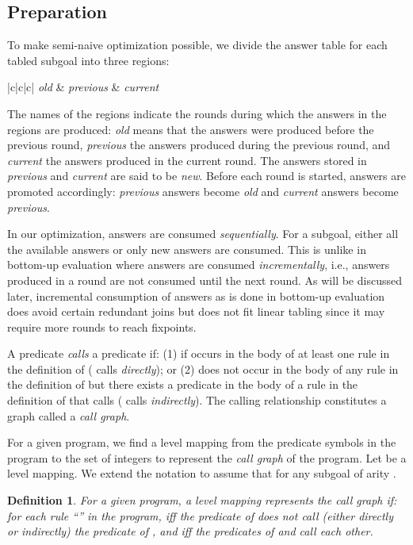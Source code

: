 \documentclass{tlp}
\newtheorem{definition}{Definition} \newtheorem{example}{Example} \newcommand{\pivot}[1]{\mathbin{\, {#1} \,}}
\begin{document}
\subsection{Preparation}
To make semi-naive optimization possible, we divide the answer table for each tabled subgoal into three regions: 
\begin{center}
\begin{oldtabular}{|c|c|c|} \oldhline
{\it old} & {\it previous} & {\it current} \\ \oldhline
\end{oldtabular}
\end{center}

\noindent
The names of the regions indicate the rounds during which the answers in the regions are produced: {\it old} means that the answers were produced before the previous round, {\it previous} the answers produced during the previous round, and {\it current} the answers produced in the current round. The answers stored in {\it previous} and {\it current} are said to be {\it new}. Before each round is started, answers are promoted accordingly: {\it previous} answers become {\it old} and {\it current} answers become {\it previous}. 

In our optimization, answers are consumed {\it sequentially}. For a subgoal, either all the available answers or only new answers are consumed. This is unlike in bottom-up evaluation where answers are consumed {\it incrementally}, i.e., answers produced in a round are not consumed until the next round. As will be discussed later, incremental consumption of answers as is done in bottom-up evaluation does avoid certain redundant joins but does not fit linear tabling since it may require more rounds to reach fixpoints.

A predicate  {\it calls} a predicate  if: (1) if  occurs in the body of at least one rule in the definition of  ( calls  {\it directly}); or (2)  does not occur in the body of any rule in the definition of  but there exists a predicate in the body of a rule in the definition of  that calls  ( calls  {\it indirectly}). The calling relationship constitutes a graph called a {\it call graph}.

For a given program, we find a level mapping from the predicate symbols in the program to the set of integers to represent the {\it call graph} of the program. Let  be a level mapping. We extend the notation to assume that  for any subgoal  of arity .

\begin{definition} {\rm For a given program, a level mapping  represents the {\it call graph} if: for each rule ``'' in the program,   iff the predicate of  does not call (either directly or indirectly) the predicate of , and  iff the predicates of  and  call each other.}
\end{definition}
\end{document}
